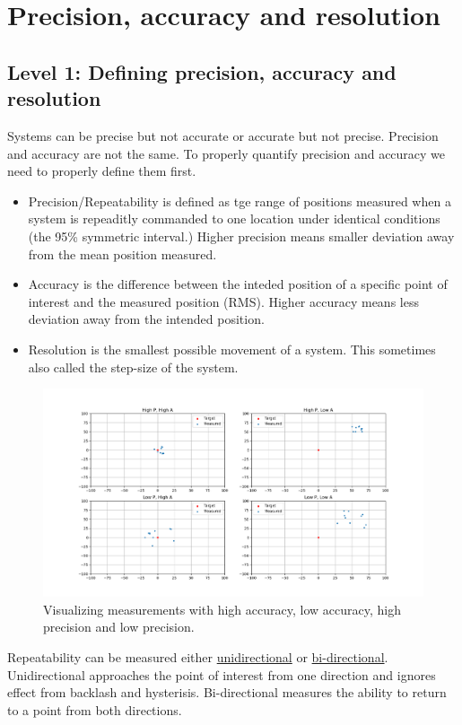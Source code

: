 \documentclass[11pt, a4paper]{article}
\numberwithin{equation}{section}
\numberwithin{figure}{section}
\begin{document}
\section{Precision, accuracy and resolution}


\subsection{Level 1: Defining precision, accuracy and resolution}
Systems can be precise but not accurate or accurate but not precise. Precision and accuracy are not the same. To properly quantify precision and accuracy we need to properly define them first.
\begin{itemize}
  \item Precision/Repeatability is defined as tge range of positions measured when a system is repeaditly commanded to one location under identical conditions (the 95\% symmetric interval.) Higher precision means smaller deviation away from the mean position measured.
  \item Accuracy is the difference between the inteded position of a specific point of interest and the measured position (RMS). Higher accuracy means less deviation away from the intended position.
  \item Resolution is the smallest possible movement of a system. This sometimes also called the step-size of the system.
\end{itemize}
\begin{figure}[h]
  \centerline{\includegraphics[width=200mm]{images/Accuracy_and_Precision.png}}
  \caption{Visualizing measurements with high accuracy, low accuracy, high precision and low precision.}
\end{figure}
Repeatability can be measured either \underline{unidirectional} or \underline{bi-directional}. Unidirectional approaches the point of interest from one direction and ignores effect from backlash and hysterisis. Bi-directional measures the ability to return to a point from both directions.
\end{document}
